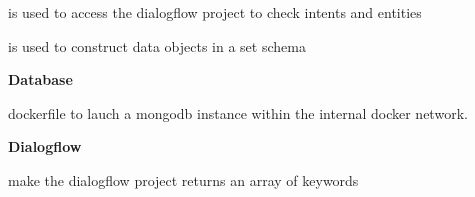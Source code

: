  is used to access the dialogflow project to check intents and entities

 is used to construct data objects in a set schema

\textbf{Database}

 dockerfile to lauch a mongodb instance within the internal docker network.

\textbf{Dialogflow}

 make the dialogflow project returns an array of keywords

